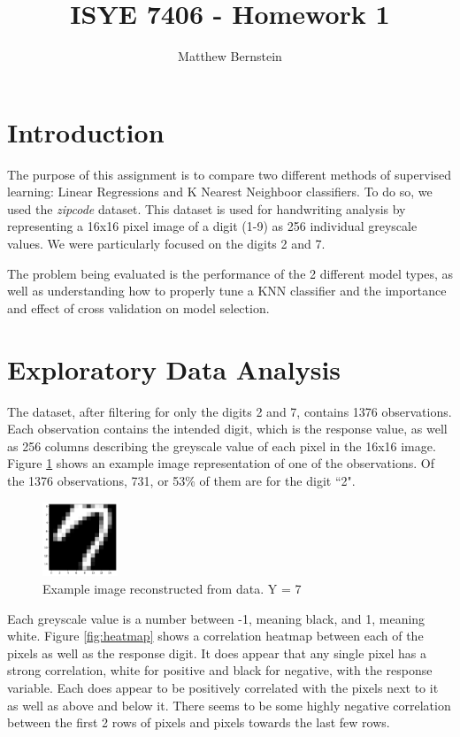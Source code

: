 \documentclass[12pt,letterpaper]{article}
\title{ISYE 7406 - Homework 1}
\author{Matthew Bernstein}
\begin{document}
\maketitle
\section*{Introduction}

The purpose of this assignment is to compare two different methods of supervised learning: Linear Regressions and K Nearest Neighboor classifiers. To do so, we used the \textit{zipcode} dataset. This dataset is used for handwriting analysis by representing a 16x16 pixel image of a digit (1-9) as 256 individual greyscale values. We were particularly focused on the digits 2 and 7.

The problem being evaluated is the performance of the 2 different model types, as well as understanding how to properly tune a KNN classifier and the importance and effect of cross validation on model selection.

\section*{Exploratory Data Analysis}

The dataset, after filtering for only the digits 2 and 7, contains 1376 observations. Each observation contains the intended digit, which is the response value, as well as 256 columns describing the greyscale value of each pixel in the 16x16 image. Figure \ref{fig:example} shows an example image representation of one of the observations. Of the 1376 observations, 731, or 53\% of them are for the digit ``2".

\begin{figure}[h]
  \centering
  \includegraphics[width=0.2\textwidth]{example}
  \caption{Example image reconstructed from data. Y = 7}
  \label{fig:example}
\end{figure}

Each greyscale value is a number between -1, meaning black, and 1, meaning white. Figure \ref{fig:heatmap} shows a correlation heatmap between each of the pixels as well as the response digit. It does appear that any single pixel has a strong correlation, white for positive and black for negative, with the response variable. Each does appear to be positively correlated with the pixels next to it as well as above and below it. There seems to be some highly negative correlation between the first 2 rows of pixels and pixels towards the last few rows. 
\end{document}
